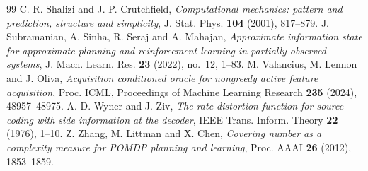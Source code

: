 \begin{thebibliography}{99}
 C. R. Shalizi and J. P. Crutchfield, \emph{Computational mechanics: pattern and prediction, structure and simplicity}, J. Stat. Phys. \textbf{104} (2001), 817--879.
 J. Subramanian, A. Sinha, R. Seraj and A. Mahajan, \emph{Approximate information state for approximate planning and reinforcement learning in partially observed systems}, J. Mach. Learn. Res. \textbf{23} (2022), no.~12, 1--83.
 M. Valancius, M. Lennon and J. Oliva, \emph{Acquisition conditioned oracle for nongreedy active feature acquisition}, Proc. ICML, Proceedings of Machine Learning Research \textbf{235} (2024), 48957--48975.
 A. D. Wyner and J. Ziv, \emph{The rate-distortion function for source coding with side information at the decoder}, IEEE Trans. Inform. Theory \textbf{22} (1976), 1--10.
 Z. Zhang, M. Littman and X. Chen, \emph{Covering number as a complexity measure for POMDP planning and learning}, Proc. AAAI \textbf{26} (2012), 1853--1859.
\end{thebibliography}
